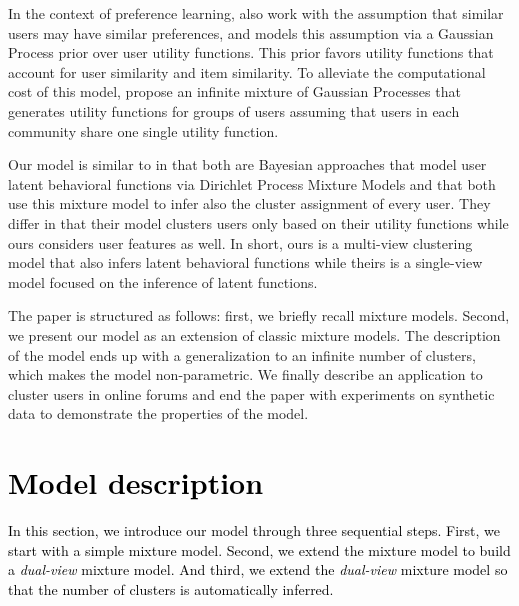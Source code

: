 \documentclass[smallextended]{svjour3}          %
\newcommand\alberto[1]{\textcolor{black}{#1}}
\begin{document}
In the context of preference learning, \cite{Bonilla2010} also work with the assumption that similar users may have similar preferences, and models this assumption via a Gaussian Process prior over user utility functions. This prior favors utility functions that account for user similarity and item similarity. To alleviate the computational cost of this model, \cite{Abbasnejad2013a} propose an infinite mixture of Gaussian Processes that generates utility functions for groups of users assuming that users in each community share one single utility function.

Our model is similar to \cite{Abbasnejad2013a} in that both are Bayesian approaches that model user latent behavioral functions via Dirichlet Process Mixture Models and that both use this mixture model to infer also the cluster assignment of every user. They differ in that their model clusters users only based on their utility functions while ours considers user features as well. In short, ours is a multi-view clustering model that also infers latent behavioral functions while theirs is a single-view model focused on the inference of latent functions. 

The paper is structured as follows: first, we briefly recall mixture models. Second, we present our model as an extension of classic mixture models. The description of the model ends up with a generalization to an infinite number of clusters, which makes the model non-parametric. We finally describe an application to cluster users in online forums and end the paper with experiments on synthetic data to demonstrate the properties of the model.


\section{\alberto{Model description}}\label{sec:modeldescription}
\alberto{In this section, we introduce our model through three sequential steps. First, we start with a simple mixture model. Second, we extend the mixture model to build a \textit{dual-view} mixture model. And third, we extend the \textit{dual-view} mixture model so that the number of clusters is automatically inferred.}
\end{document}
